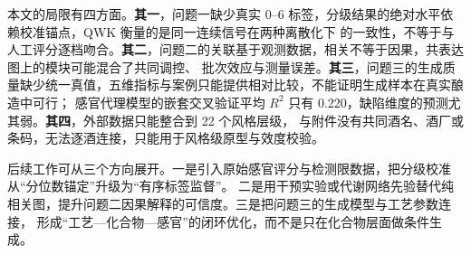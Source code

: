 ﻿\documentclass[UTF8,a4paper,zihao=-4]{ctexart}
\numberwithin{figure}{section}
\numberwithin{table}{section}
\numberwithin{equation}{section}
\begin{document}
本文的局限有四方面。\textbf{其一}，问题一缺少真实 0--6 标签，分级结果的绝对水平依赖校准锚点，QWK 衡量的是同一连续信号在两种离散化下
的一致性，不等于与人工评分逐档吻合。\textbf{其二}，问题二的关联基于观测数据，相关不等于因果，共表达图上的模块可能混合了共同调控、
批次效应与测量误差。\textbf{其三}，问题三的生成质量缺少统一真值，五维指标与案例只能提供相对比较，不能证明生成样本在真实酿造中可行；
感官代理模型的嵌套交叉验证平均 $R^2$ 只有 0.220，缺陷维度的预测尤其弱。\textbf{其四}，外部数据只能整合到 22 个风格层级，
与附件没有共同酒名、酒厂或条码，无法逐酒连接，只能用于风格级原型与效度校验。

后续工作可从三个方向展开。一是引入原始感官评分与检测限数据，把分级校准从“分位数锚定”升级为“有序标签监督”。
二是用干预实验或代谢网络先验替代纯相关图，提升问题二因果解释的可信度。三是把问题三的生成模型与工艺参数连接，
形成“工艺—化合物—感官”的闭环优化，而不是只在化合物层面做条件生成。
\end{document}
